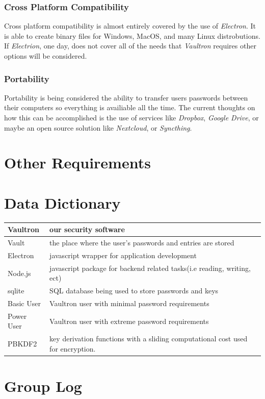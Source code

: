 \documentclass[11pt]{report}
\begin{document}
\subsection{Cross Platform Compatibility}
Cross platform compatibility is almost entirely covered by the use
of \textit{Electron}. It is able to create binary files for Windows,
MacOS, and many Linux distrobutions. If \textit{Electrion}, one day,
does not cover all of the needs that \textit{Vaultron} requires other
options will be considered. 

\subsection{Portability}
Portability is being considered the ability to transfer users passwords
between their computers so everything is availiable all the time. The
current thoughts on how this can be accomplished is the use of services
like \textit{Dropbox}, \textit{Google Drive}, or maybe an open source
solution like \textit{Nextcloud}, or \textit{Syncthing}. 




\chapter{Other Requirements}

\begin{appendices}
    \chapter{Data Dictionary}

    \tabulinesep=1.2mm
    \begin{tabu} to 0.97\textwidth { | X[l] | X[l] | }
        \hline
        Vaultron & our security software  \\
        \hline
        Vault & the place where the user's passwords and entries are stored  \\
        \hline
        Electron  & javascript wrapper for application development  \\
        \hline
        Node.js  & javascript package for backend related tasks(i.e reading, writing, ect) \\
        \hline
        sqlite  & SQL database being used to store passwords and keys\\
        \hline
        Basic User  & Vaultron user with minimal password requirements \\
        \hline
        Power User  & Vaultron user with extreme password requirements \\
        \hline
        PBKDF2 &  key derivation functions with a sliding computational cost used for encryption. \\
        \hline
    \end{tabu}


    \chapter{Group Log}
\end{appendices}
\end{document}
